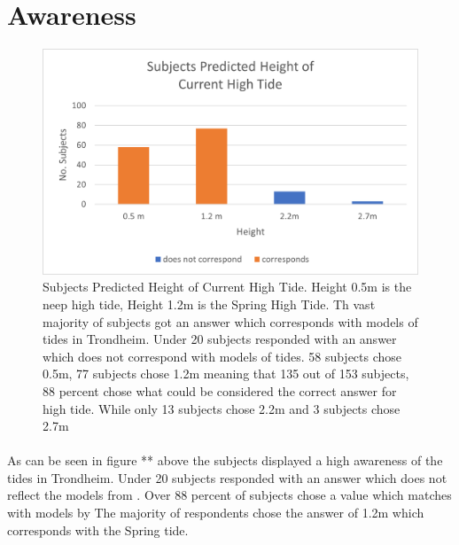 \paragraph{}

\section{Awareness}

\begin{figure}[h]
    \centering
    \includegraphics{fig_results/2022-hightide-answers.png}
    \caption{Subjects Predicted Height of Current High Tide. Height 0.5m is the neep high tide, Height 1.2m is the Spring High Tide. Th vast majority of subjects got an answer which corresponds with models of tides in Trondheim. Under 20 subjects responded with an answer which does not correspond with models of tides. 58 subjects chose 0.5m, 77 subjects chose 1.2m meaning that 135 out of 153 subjects, 88 percent chose what could be considered the correct answer for high tide. While only 13 subjects chose 2.2m and 3 subjects chose 2.7m}
    \label{fig:high-tide-answer}
\end{figure}
\paragraph{}
As can be seen in figure ** above the subjects displayed a high awareness of the tides in Trondheim. Under 20 subjects responded with an answer which does not reflect the models from \cite{kartverket_se_2021}. Over 88 percent of subjects chose a value which matches with models by \cite{kartverket_se_2021} The majority of respondents chose the answer of 1.2m which corresponds with the Spring tide. 

